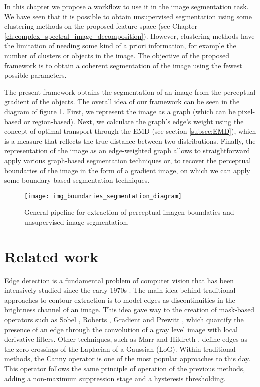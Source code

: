 In this chapter we propose a workflow to use it in the image segmentation task. We have seen that it is possible to obtain unsupervised segmentation using some clustering methods on the proposed feature space (see Chapter \ref{ch:complex_spectral_image_decomposition}). However, clustering methods have the limitation of needing some kind of a priori information, for example the number of clusters or objects in the image. The objective of the proposed framework is to obtain a coherent segmentation of the image using the fewest possible parameters.

The present framework obtains the segmentation of an image from the perceptual gradient of the objects. The overall idea of our framework can be seen in the diagram of figure \ref{fig:pipeline_gabor_image_segmentation}. First, we represent the image as a graph (which can be pixel-based or region-based). Next, we calculate the graph's edge's weight using the concept of optimal transport through the EMD (see section \ref{subsec:EMD}), which is a measure that reflects the true distance between two distributions. Finally, the representation of the image as an edge-weighted graph allows to straightforward apply various graph-based segmentation techniques or, to recover the perceptual boundaries of the image in the form of a gradient image, on which we can apply some boundary-based segmentation techniques.


\begin{figure}[!ht]
	\centering
	\texttt{[image: img\_boundaries\_segmentation\_diagram]}
	\caption{General pipeline for extraction of perceptual imagen boundaties and unsupervised image segmentation.}\label{fig:pipeline_gabor_image_segmentation}
\end{figure}

\section{Related work}
Edge detection is a fundamental problem of computer vision that has been intensively studied since the early 1970s \citep{Hueckel:JACM:1971, Fram.Deutsch:TC:1975}. The main idea behind traditional approaches to contour extraction is to model edges as discontinuities in the brightness channel of an image. This idea gave way to the creation of mask-based operators such as Sobel \citep{Maitre:Book:2003}, Roberts \citep{Roberts:Thesis:1963}, Gradient \citep{Maitre:Book:2003} and Prewitt \citep{Prewitt:PPP:1970}, which quantify the presence of an edge through the convolution of a gray level image with local derivative filters. Other techniques, such as Marr and Hildreth \citep{Marr.Hildreth:PRS:1980}, define edges as the zero crossings of the Laplacian of a Gaussian (LoG). Within traditional methods, the Canny \citep{Canny:PAMI:1986} operator is one of the most popular approaches to this day. This operator follows the same principle of operation of the previous methods, adding a non-maximum suppression stage and a hysteresis thresholding.


